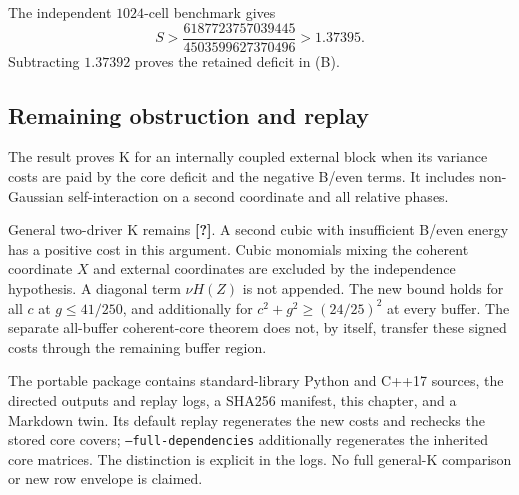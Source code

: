 The independent \(1024\)-cell benchmark gives
\[
S>\frac{6187723757039445}{4503599627370496}>1.37395.
\]
Subtracting \(1.37392\) proves the retained deficit in (B).

\subsection{Remaining obstruction and replay}
The result proves K for an internally coupled external block when its
variance costs are paid by the core deficit and the negative B/even terms.
It includes non-Gaussian self-interaction on a second coordinate and all
relative phases.

General two-driver K remains \textbf{[?]}. A second cubic with insufficient
B/even energy has a positive cost in this argument. Cubic monomials mixing
the coherent coordinate \(X\) and external coordinates are excluded by the
independence hypothesis. A diagonal term \(\nu H(Z)\) is not appended.
The new bound holds for all \(c\) at \(g\le41/250\), and additionally for
\(c^2+g^2\ge(24/25)^2\) at every buffer. The separate all-buffer coherent-core
theorem does not, by itself, transfer these signed costs through the remaining
buffer region.

The portable package contains standard-library Python and C++17 sources,
the directed outputs and replay logs, a SHA256 manifest, this chapter, and a
Markdown twin. Its default replay regenerates the new costs and rechecks the
stored core covers; \texttt{--full-dependencies} additionally regenerates the
inherited core matrices. The distinction is explicit in the logs.
No full general-K comparison or new row envelope is claimed.
